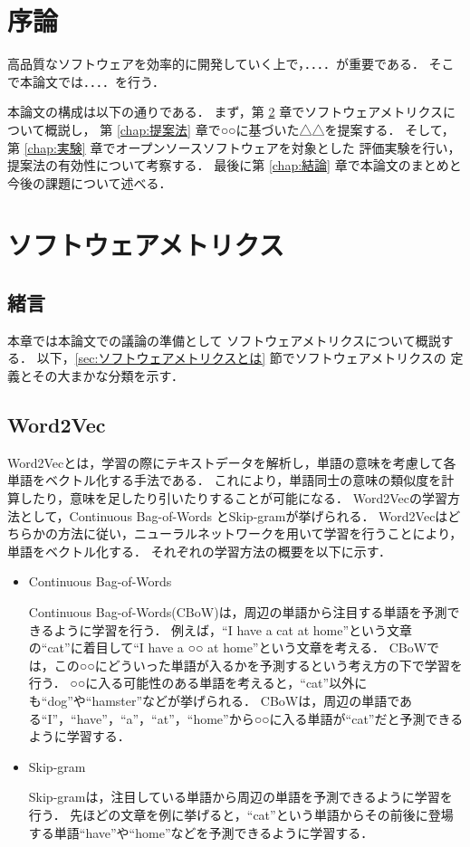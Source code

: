 \documentclass{thesis}
\begin{document}
\tableofcontents

\chapter{序論}

高品質なソフトウェアを効率的に開発していく上で，．．．．が重要である\cite{ソフトウェア工学の基礎知識}．
そこで本論文では．．．．を行う．

本論文の構成は以下の通りである．
まず，第 \ref{chap:メトリクス} 章でソフトウェアメトリクスについて概説し，
第 \ref{chap:提案法} 章で○○に基づいた△△を提案する．
そして，第 \ref{chap:実験} 章でオープンソースソフトウェアを対象とした
評価実験を行い，提案法の有効性について考察する．
最後に第 \ref{chap:結論} 章で本論文のまとめと今後の課題について述べる．

\chapter{ソフトウェアメトリクス}
\label{chap:メトリクス}

\section{緒言}

本章では本論文での議論の準備として
ソフトウェアメトリクスについて概説する．
以下，\ref{sec:ソフトウェアメトリクスとは} 節でソフトウェアメトリクスの
定義とその大まかな分類を示す．


\section{Word2Vec}
Word2Vec\cite{word2vec}とは，学習の際にテキストデータを解析し，単語の意味を考慮して各単語をベクトル化する手法である．
これにより，単語同士の意味の類似度を計算したり，意味を足したり引いたりすることが可能になる．
Word2Vecの学習方法として，Continuous Bag-of-Words とSkip-gramが挙げられる．
Word2Vecはどちらかの方法に従い，ニューラルネットワークを用いて学習を行うことにより，単語をベクトル化する．
それぞれの学習方法の概要を以下に示す．
\begin{itemize}
	\item Continuous Bag-of-Words
	
	Continuous Bag-of-Words(CBoW)\cite{word2vec}は，周辺の単語から注目する単語を予測できるように学習を行う．
	例えば，``I have a cat at home''という文章の``cat''に着目して``I have a ○○ at home''という文章を考える．
	CBoWでは，この○○にどういった単語が入るかを予測するという考え方の下で学習を行う．
	○○に入る可能性のある単語を考えると，``cat''以外にも``dog''や``hamster''などが挙げられる．
	CBoWは，周辺の単語である``I''，``have''，``a''，``at''，``home''から○○に入る単語が``cat''だと予測できるように学習する．
	\item Skip-gram
	
	Skip-gram\cite{word2vec}は，注目している単語から周辺の単語を予測できるように学習を行う．
	先ほどの文章を例に挙げると，``cat''という単語からその前後に登場する単語``have''や``home''などを予測できるように学習する．
\end{itemize}
\end{document}
